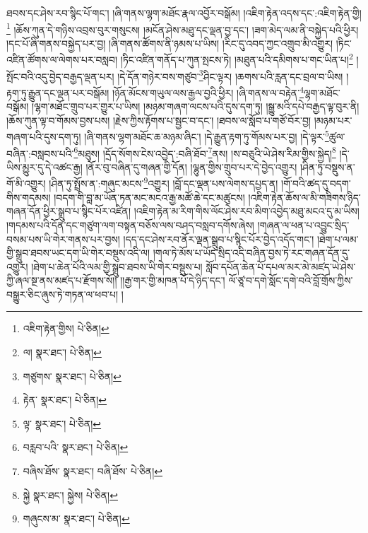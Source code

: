 ཐབས་དང་ཤེས་རབ་སྙིང་པོ་གང་། །ཞི་གནས་ལྷག་མཐོང་རྣལ་འབྱོར་བསྒོམ། །འཇིག་རྟེན་འདས་དང་:འཇིག་རྟེན་གྱི།\footnote{འཇིག་རྟེན་གྱིས།  པེ་ཅིན། } །ཆོས་ཀུན་དེ་གཉིས་འབྲས་བུར་གསུངས། །མངོན་ཤེས་མཐུ་དང་ལྡན་བྱ་དང་། །ཟག་མེད་ལམ་ནི་བསྐྱེད་པའི་ཕྱིར། །དང་པོ་ཞི་གནས་བསྐྱེད་པར་བྱ། །ཞི་གནས་ཚོགས་ནི་ཉམས་པ་ཡིས། །རིང་དུ་འབད་ཀྱང་འགྲུབ་མི་འགྱུར། །ཏིང་འཛིན་ཚོགས་ལ་ལེགས་པར་བསླབ། །ཏིང་འཛིན་གནོད་པ་ཀུན་སྤངས་ཏེ། །མཐུན་པའི་དམིགས་པ་གང་ཡིན་པ།\footnote{ལ།  སྣར་ཐང་།  པེ་ཅིན། } །སྤོང་བའི་འདུ་བྱེད་བརྒྱད་ལྡན་པར། །དེ་དོན་གཉེར་བས་གཙུབ་\footnote{གཙུགས་  སྣར་ཐང་།  པེ་ཅིན། }ཤིང་ལྟར། །ཆགས་པའི་རླན་དང་བྲལ་བ་ཡིས། །རྟག་ཏུ་རྒྱུན་དང་ལྡན་པར་བསྒོམ། །ཉོན་མོངས་གཡུལ་ལས་རྒྱལ་བྱའི་ཕྱིར། །ཞི་གནས་ལ་བརྟེན་\footnote{རྟེན་  སྣར་ཐང་།  པེ་ཅིན། }ལྷག་མཐོང་བསྒོམ། །ལྷག་མཐོང་གྲུབ་པར་གྱུར་པ་ཡིས། །མཉམ་གཞག་ལངས་པའི་དུས་དག་ཏུ། །སྒྱུ་མའི་དཔེ་བརྒྱད་ལྟ་བུར་ནི། །ཆོས་ཀུན་ལྟ་བ་གོམས་བྱས་པས། །རྗེས་ཀྱིས་རྟོགས་པ་སྦྱང་བ་དང་། །ཐབས་ལ་སློབ་པ་གཙོ་བོར་བྱ། །མཉམ་པར་གཞག་པའི་དུས་དག་ཏུ། །ཞི་གནས་ལྷག་མཐོང་ཆ་མཉམ་ཞིང་། །དེ་རྒྱུན་རྟག་ཏུ་གོམས་པར་བྱ། །དེ་ལྟར་\footnote{ལྟ་  སྣར་ཐང་།  པེ་ཅིན། }ཚུལ་བཞིན་:བསླབས་པའི་\footnote{བརླབ་པའི་  སྣར་ཐང་།  པེ་ཅིན། }མཐུས། །དྲོད་སོགས་ངེས་འབྱེད་:བཞི་ཐོབ་\footnote{བཞིས་ཐོས་  སྣར་ཐང་། བཞི་ཐོས་  པེ་ཅིན། }ནས། །ས་བཅུའི་ཡེ་ཤེས་རིམ་གྱིས་སྐྱེད།\footnote{སྐྱེ  སྣར་ཐང་། སྐྱེས།  པེ་ཅིན། } །དེ་ཡིས་མྱུར་དུ་དེ་འཚང་རྒྱ། །ནོར་བུ་བཞིན་དུ་གཞན་གྱི་དོན། །ལྷུན་གྱིས་གྲུབ་པར་དེ་བྱེད་འགྱུར། །ཤིན་ཏུ་བསྡུས་ན་གོ་མི་འགྱུར། །ཤིན་ཏུ་སྤྲོས་ན་:གཞུང་མངས་\footnote{གཞུངས་མ་  སྣར་ཐང་།  པེ་ཅིན། }འགྱུར། །བློ་དང་ལྡན་པས་ལེགས་དཔྱད་ན། །གོ་བའི་ཚད་དུ་བདག་གིས་གདམས། །བདག་གི་བླ་མ་ཡོན་ཏན་མང་མངའ་རྒྱ་མཚོ་ཆེ་དང་མཚུངས། །འཇིག་རྟེན་ཆོས་ལ་མི་གཟིགས་ཉིད་གཞན་དོན་ཕྱིར་སྒྲུབ་པ་སྙིང་པོར་འཛིན། །འཇིག་རྟེན་མ་རིག་གིས་ལོང་ཤེས་རབ་མིག་འབྱེད་མཐུ་མངའ་དུ་མ་ཡིས། །གདམས་པའི་དོན་དང་གཙུག་ལག་བསྟན་བཅོས་ལས་བཤད་བསླབ་དགོས་ཞེས། །གཞན་ལ་ཕན་པ་འབྱུང་སྲིད་བསམ་པས་ཡི་གེར་གནས་པར་བྱས། །དད་དང་ཤེས་རབ་ནོར་ལྡན་སྒྲུབ་པ་སྙིང་པོར་བྱེད་འདོད་གང་། །ཐེག་པ་ལམ་གྱི་སྒྲུབ་ཐབས་ཡང་དག་ཡི་གེར་བསྡུས་འདི་ལ། །གལ་ཏེ་མོས་པ་ཡོད་སྲིད་འདི་བཞིན་བྱས་ཏེ་རང་གཞན་དོན་དུ་འགྱུར། །ཐེག་པ་ཆེན་པོའི་ལམ་གྱི་སྒྲུབ་ཐབས་ཡི་གེར་བསྡུས་པ། སློབ་དཔོན་ཆེན་པོ་དཔལ་མར་མེ་མཛད་ཡེ་ཤེས་ཀྱི་ཞལ་སྔ་ནས་མཛད་པ་རྫོགས་སོ།། །།རྒྱ་གར་གྱི་མཁན་པོ་དེ་ཉིད་དང་། ལོ་ཙཱ་བ་དགེ་སློང་དགེ་བའི་བློ་གྲོས་ཀྱིས་བསྒྱུར་ཅིང་ཞུས་ཏེ་གཏན་ལ་ཕབ་པ། ། 